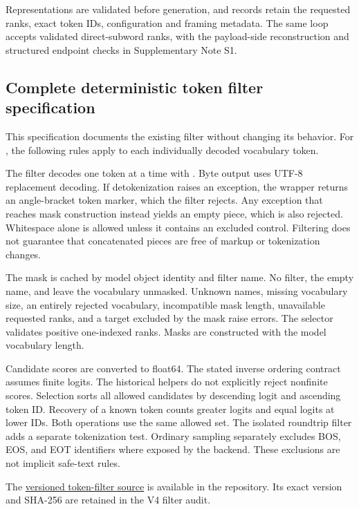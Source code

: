 \documentclass[fleqn,10pt]{wlscirep}
\DeclareRobustCommand{\code}[1]{{\normalfont\path{#1}}}
\begin{document}
Representations are validated before generation, and records retain the requested ranks, exact token IDs, configuration and framing metadata. The same loop accepts validated direct-subword ranks, with the payload-side reconstruction and structured endpoint checks in Supplementary Note S1.

\subsection*{Complete deterministic token filter specification}\label{sec:v4-filter}
This specification documents the existing filter without changing its behavior.
For \code{safe_text_filter_v1}, the following rules apply to each individually decoded vocabulary token.

The filter decodes one token at a time with \code{safe_detokenize}. Byte output uses UTF-8 replacement decoding. If detokenization raises an exception, the wrapper returns an angle-bracket token marker, which the filter rejects. Any exception that reaches mask construction instead yields an empty piece, which is also rejected. Whitespace alone is allowed unless it contains an excluded control. Filtering does not guarantee that concatenated pieces are free of markup or tokenization changes.

The mask is cached by model object identity and filter name. No filter, the empty name, and \code{none} leave the vocabulary unmasked. Unknown names, missing vocabulary size, an entirely rejected vocabulary, incompatible mask length, unavailable requested ranks, and a target excluded by the mask raise errors. The selector validates positive one-indexed ranks. Masks are constructed with the model vocabulary length.

Candidate scores are converted to float64. The stated inverse ordering contract assumes finite logits. The historical helpers do not explicitly reject nonfinite scores. Selection sorts all allowed candidates by descending logit and ascending token ID. Recovery of a known token counts greater logits and equal logits at lower IDs. Both operations use the same allowed set. The isolated roundtrip filter adds a separate tokenization test. Ordinary sampling separately excludes BOS, EOS, and EOT identifiers where exposed by the backend. These exclusions are not implicit safe-text rules.

The \href{https://github.com/mantzaris/llm-rankcloak/blob/60d23fffe5962d4e0b652fa045d762ca10bc3dcc/rankcloak/token_filters.py}{versioned token-filter source} is available in the repository. Its exact version and SHA-256 are retained in the V4 filter audit.
\end{document}
